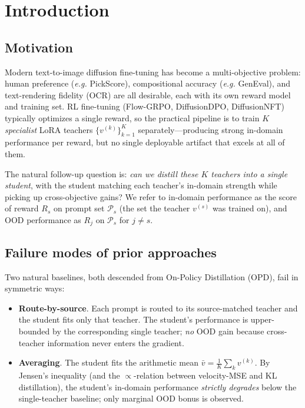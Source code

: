 \documentclass[11pt,a4paper]{article}
\theoremstyle{definition}
\begin{document}
\tableofcontents
\newpage

\section{Introduction}
\label{sec:intro}

\subsection{Motivation}

Modern text-to-image diffusion fine-tuning has become a multi-objective
problem: human preference (\emph{e.g.\@} PickScore), compositional accuracy
(\emph{e.g.\@} GenEval), and text-rendering fidelity (OCR) are all desirable,
each with its own reward model and training set. RL fine-tuning
(Flow-GRPO, DiffusionDPO,
DiffusionNFT) typically optimizes a single reward, so
the practical pipeline is to train $K$ \emph{specialist} LoRA teachers
$\{v^{(k)}\}_{k=1}^K$ separately---producing strong in-domain performance per
reward, but no single deployable artifact that excels at all of them.

The natural follow-up question is: \emph{can we distill these $K$ teachers
into a single student}, with the student matching each teacher's in-domain
strength while picking up cross-objective gains? We refer to in-domain
performance as the score of reward $R_s$ on prompt set
$\mathcal{P}_s$ (the set the teacher $v^{(s)}$ was trained on), and OOD
performance as $R_j$ on $\mathcal{P}_s$ for $j\neq s$.

\subsection{Failure modes of prior approaches}

Two natural baselines, both descended from On-Policy Distillation
(OPD), fail in symmetric ways:

\begin{itemize}[leftmargin=1.5em]
\item \textbf{Route-by-source}. Each prompt is routed to
its source-matched teacher and the student fits only that teacher.
The student's performance is upper-bounded by the corresponding single
teacher; \emph{no} OOD gain because cross-teacher information never enters
the gradient.

\item \textbf{Averaging}. The student fits the arithmetic mean
$\bar v = \tfrac{1}{K}\sum_k v^{(k)}$. By Jensen's inequality (and the
$\propto$-relation between velocity-MSE and KL distillation), the student's
in-domain performance \emph{strictly degrades} below the single-teacher
baseline; only marginal OOD bonus is observed.
\end{itemize}
\end{document}
